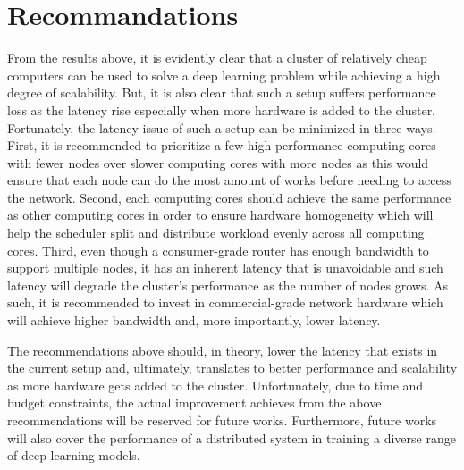 \documentclass{IEEEtran}
\begin{document}
    \section{Recommandations}
        From the results above, it is evidently clear that a cluster of relatively cheap computers can be used to solve a deep learning problem while achieving a high degree of scalability. But, it is also clear that such a setup suffers performance loss as the latency rise especially when more hardware is added to the cluster. Fortunately, the latency issue of such a setup can be minimized in three ways. First, it is recommended to prioritize a few high-performance computing cores with fewer nodes over slower computing cores with more nodes as this would ensure that each node can do the most amount of works before needing to access the network. Second, each computing cores should achieve the same performance as other computing cores in order to ensure hardware homogeneity which will help the scheduler split and distribute workload evenly across all computing cores. Third, even though a consumer-grade router has enough bandwidth to support multiple nodes, it has an inherent latency that is unavoidable and such latency will degrade the cluster's performance as the number of nodes grows. As such, it is recommended to invest in commercial-grade network hardware which will achieve higher bandwidth and, more importantly, lower latency. 
            
        The recommendations above should, in theory, lower the latency that exists in the current setup and, ultimately, translates to better performance and scalability as more hardware gets added to the cluster. Unfortunately, due to time and budget constraints, the actual improvement achieves from the above recommendations will be reserved for future works. Furthermore, future works will also cover the performance of a distributed system in training a diverse range of deep learning models. 
        
        \nocite{*}

    
    
    
\end{document}
